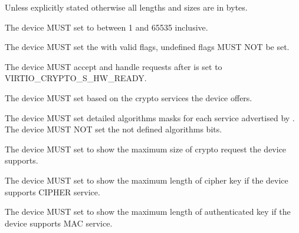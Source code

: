\begin{note}
Unless explicitly stated otherwise all lengths and sizes are in bytes.
\end{note}


\begin{itemize*}
\item The device MUST set  to between 1 and 65535 inclusive.
\item The device MUST set the  with valid flags, undefined flags MUST NOT be set.
\item The device MUST accept and handle requests after  is set to VIRTIO_CRYPTO_S_HW_READY.
\item The device MUST set  based on the crypto services the device offers.
\item The device MUST set detailed algorithms masks for each service advertised by .
    The device MUST NOT set the not defined algorithms bits.
\item The device MUST set  to show the maximum size of crypto request the device supports.
\item The device MUST set  to show the maximum length of cipher key if the
    device supports CIPHER service.
\item The device MUST set  to show the maximum length of authenticated key if
    the device supports MAC service.
\end{itemize*}


